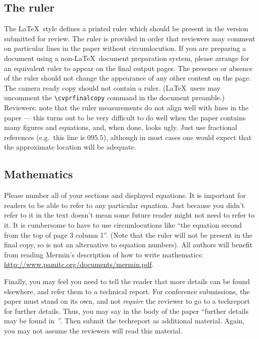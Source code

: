 \documentclass[10pt,twocolumn,letterpaper]{article}
\begin{document}
\subsection{The ruler}
The \LaTeX\ style defines a printed ruler which should be present in the
version submitted for review.  The ruler is provided in order that
reviewers may comment on particular lines in the paper without
circumlocution.  If you are preparing a document using a non-\LaTeX\
document preparation system, please arrange for an equivalent ruler to
appear on the final output pages.  The presence or absence of the ruler
should not change the appearance of any other content on the page.  The
camera ready copy should not contain a ruler. (\LaTeX\ users may uncomment
the \verb'\cvprfinalcopy' command in the document preamble.)  Reviewers:
note that the ruler measurements do not align well with lines in the paper
--- this turns out to be very difficult to do well when the paper contains
many figures and equations, and, when done, looks ugly.  Just use fractional
references (e.g.\ this line is $095.5$), although in most cases one would
expect that the approximate location will be adequate.

\subsection{Mathematics}

Please number all of your sections and displayed equations.  It is
important for readers to be able to refer to any particular equation.  Just
because you didn't refer to it in the text doesn't mean some future reader
might not need to refer to it.  It is cumbersome to have to use
circumlocutions like ``the equation second from the top of page 3 column
1''.  (Note that the ruler will not be present in the final copy, so is not
an alternative to equation numbers).  All authors will benefit from reading
Mermin's description of how to write mathematics:
\url{http://www.pamitc.org/documents/mermin.pdf}.

Finally, you may feel you need to tell the reader that more details can be
found elsewhere, and refer them to a technical report.  For conference
submissions, the paper must stand on its own, and not {\em require} the
reviewer to go to a techreport for further details.  Thus, you may say in
the body of the paper ``further details may be found
in~\cite{Authors14b}''.  Then submit the techreport as additional material.
Again, you may not assume the reviewers will read this material.
\end{document}
